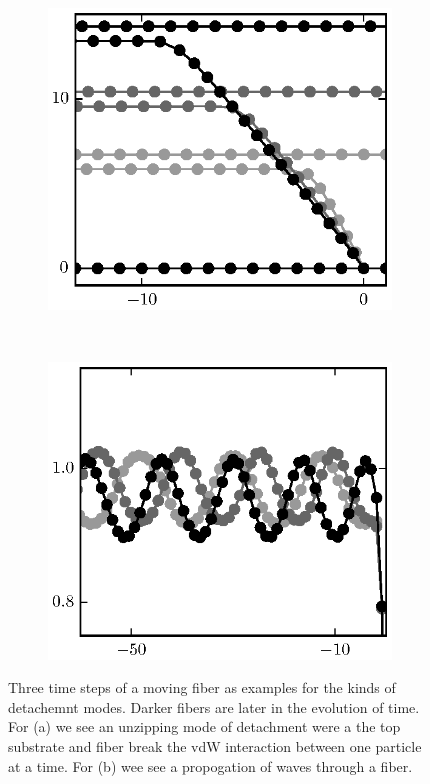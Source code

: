 	\begin{figure}
		\centering
		\begin{subfigure}{.5\textwidth}
			\centering
			\includegraphics{./fig/ch3/pull/unzip_anim.eps}
			\caption{\label{subfig:unzip}}
		\end{subfigure}%
		~
		\begin{subfigure}{.5\textwidth}
			\centering
			\includegraphics{./fig/ch3/pull/wave_anim.eps}
			\caption{\label{subfig:travel_waves}}
		\end{subfigure}
		\caption{Three time steps of a moving fiber as examples for the kinds of detachemnt modes. Darker fibers are later in the evolution of time. For (a) we see an unzipping mode of detachment were a the top substrate and fiber break the vdW interaction between one particle at a time. For (b) wee see a propogation of waves through a fiber.\label{fig:animation}}	
	\end{figure}
	